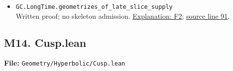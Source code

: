 \documentclass[
  letterpaper,
  11pt]{article}
\begin{document}
\begin{itemize}
  \href{https://github.com/qinz1yang/differential-geometry-dev/blob/ea0fae60ee01ef8c8d9b57a51794c6538f679c5d/DifferentialGeometry/Geometry/Flow/RicciFlow/LongTime/RegularSlice.lean\#L67}{source
  line 67}.
\item
  {\small\texttt{GC.\allowbreak{}Long\allowbreak{}Time.\allowbreak{}geometrizes\_\allowbreak{}of\_\allowbreak{}late\_\allowbreak{}slice\_\allowbreak{}supply}}\\
  Written proof; no skeleton admission.
  \hyperref[f2-slices]{Explanation: F2};
  \href{https://github.com/qinz1yang/differential-geometry-dev/blob/ea0fae60ee01ef8c8d9b57a51794c6538f679c5d/DifferentialGeometry/Geometry/Flow/RicciFlow/LongTime/RegularSlice.lean\#L91}{source
  line 91}.
\end{itemize}


\subsection{M14. Cusp.lean}\label{m14.-cusp.lean}

\textbf{File:}
{\small\texttt{Geometry/\allowbreak{}Hyperbolic/\allowbreak{}Cusp.\allowbreak{}lean}}
\end{document}
